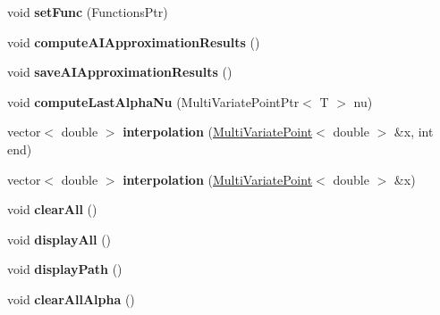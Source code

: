 \begin{DoxyCompactItemize}
\item 
void {\bfseries set\+Func} (Functions\+Ptr)\hypertarget{class_interpolation_a54f27ebe81f42f4619d50afefc0e6823}{}\label{class_interpolation_a54f27ebe81f42f4619d50afefc0e6823}

\item 
void {\bfseries compute\+A\+I\+Approximation\+Results} ()\hypertarget{class_interpolation_a024b108311beb323da7b5dafc2dc3481}{}\label{class_interpolation_a024b108311beb323da7b5dafc2dc3481}

\item 
void {\bfseries save\+A\+I\+Approximation\+Results} ()\hypertarget{class_interpolation_a8f7ae9ddb58ff7e8e6228154483669a7}{}\label{class_interpolation_a8f7ae9ddb58ff7e8e6228154483669a7}

\item 
void {\bfseries compute\+Last\+Alpha\+Nu} (Multi\+Variate\+Point\+Ptr$<$ T $>$ nu)\hypertarget{class_interpolation_a44e098709ec582a2e7c8d073ea3e6ed9}{}\label{class_interpolation_a44e098709ec582a2e7c8d073ea3e6ed9}

\item 
vector$<$ double $>$ {\bfseries interpolation} (\hyperlink{class_multi_variate_point}{Multi\+Variate\+Point}$<$ double $>$ \&x, int end)\hypertarget{class_interpolation_a04fea07bd082c5f9e6b0aaae31dbe831}{}\label{class_interpolation_a04fea07bd082c5f9e6b0aaae31dbe831}

\item 
vector$<$ double $>$ {\bfseries interpolation} (\hyperlink{class_multi_variate_point}{Multi\+Variate\+Point}$<$ double $>$ \&x)\hypertarget{class_interpolation_adde238b24c33684c867d8abbd5a983b1}{}\label{class_interpolation_adde238b24c33684c867d8abbd5a983b1}

\item 
void {\bfseries clear\+All} ()\hypertarget{class_interpolation_a1456efaffc06c2e9855d40c0fa8f3ade}{}\label{class_interpolation_a1456efaffc06c2e9855d40c0fa8f3ade}

\item 
void {\bfseries display\+All} ()\hypertarget{class_interpolation_a4844791e5ba6c08962cbe5056e295dc2}{}\label{class_interpolation_a4844791e5ba6c08962cbe5056e295dc2}

\item 
void {\bfseries display\+Path} ()\hypertarget{class_interpolation_adc274d302f0947bcc72ca4dfb5ad01bc}{}\label{class_interpolation_adc274d302f0947bcc72ca4dfb5ad01bc}

\item 
void {\bfseries clear\+All\+Alpha} ()\hypertarget{class_interpolation_a4ddc693d736598ab701330b834576284}{}\label{class_interpolation_a4ddc693d736598ab701330b834576284}


\end{DoxyCompactItemize}
